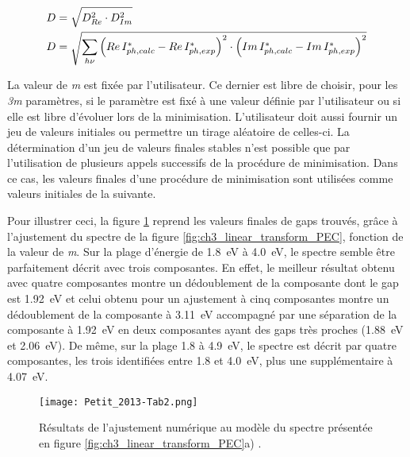 \begin{refsection}
    \begin{equation}
        \begin{split}
            D &= \sqrt{D^2_{Re} \cdot D^2_{Im}}\\
            D &= \sqrt{ \sum_{h\nu} \left( Re \, I_{ph,calc}^{\ast} - Re \, I_{ph,exp}^{\ast} \right)^2 \cdot \left( Im \, I_{ph,calc}^{\ast} - Im \, I_{ph,exp}^{\ast}
            \right)^2}
        \end{split}
        \label{eq:ch3_JPP_distance}
    \end{equation}


    La valeur de \emph{m} est fixée par l’utilisateur.  
    Ce dernier est libre de choisir, pour les \emph{3m} paramètres, si le paramètre est fixé à
    une valeur définie par l’utilisateur ou si elle est libre d’évoluer lors de la minimisation.
    L’utilisateur doit aussi fournir un jeu de valeurs initiales ou permettre un tirage aléatoire de
    celles-ci. La détermination d’un jeu de valeurs finales stables n’est possible que par
    l’utilisation de plusieurs appels successifs de la procédure de minimisation. Dans ce cas, les
    valeurs finales d’une procédure de minimisation sont utilisées comme valeurs initiales de la
    suivante. 
    
    Pour illustrer ceci, la figure \ref{fig:ch3_table_results_2205} reprend les valeurs
    finales de gaps trouvés, grâce à l’ajustement du spectre de la figure \ref{fig:ch3_linear_transform_PEC},
    fonction de la valeur de \emph{m}. Sur la plage d’énergie de \SI{1.8}{\electronvolt} à
    \SI{4.0}{\electronvolt}, le spectre semble être parfaitement décrit avec trois composantes.
    En effet, le meilleur résultat obtenu avec quatre composantes montre un dédoublement
    de la composante dont le gap est \SI{1.92}{\electronvolt} et celui obtenu pour un ajustement à cinq composantes 
    montre un dédoublement de la composante à \SI{3.11}{\electronvolt} accompagné par une séparation de la composante à
    \SI{1.92}{\electronvolt} en deux composantes ayant des gaps très proches (\SI{1.88}{\electronvolt} et
    \SI{2.06}{\electronvolt}). De même, sur la plage 1.8 à 4.9~eV, le spectre est décrit par quatre composantes, les
    trois identifiées entre 1.8 et 4.0~eV, plus une supplémentaire à 4.07~eV.

     \begin{figure}[H]
        \centering
        \texttt{[image: Petit\_2013-Tab2.png]}
        \caption[Résultats de l'ajustement de la photocaractéristique en énergie présentée en figure
        \ref{fig:ch3_linear_transform_PEC}a).]
        {Résultats de l'ajustement numérique au modèle du spectre présentée en figure
        \ref{fig:ch3_linear_transform_PEC}a) \citep{Petit2013}.}
        \label{fig:ch3_table_results_2205}
    \end{figure}
    

\end{refsection}

